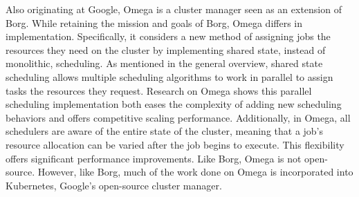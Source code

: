 Also originating at Google, Omega is a cluster manager seen as
an extension of Borg. While retaining the mission and goals of Borg,
Omega differs in implementation. Specifically, it considers a new method of
assigning jobs the resources they need on the cluster by implementing
shared state, instead of monolithic, scheduling. As mentioned in the general
overview, shared state scheduling allows multiple scheduling algorithms to work
in parallel to assign tasks the resources they request. Research on Omega shows
this parallel scheduling implementation both eases the complexity of adding new
scheduling behaviors and offers competitive scaling performance.\cite[pg.
358-359]{omega} Additionally, in Omega, all schedulers are aware of the entire
state of the cluster, meaning that a job's resource allocation can be
varied after the job begins to execute. This flexibility offers significant
performance improvements.\cite[pg.352]{omega} Like Borg, Omega is not
open-source. However, like Borg, much of the work done on Omega is incorporated
into Kubernetes, Google's open-source cluster manager.

